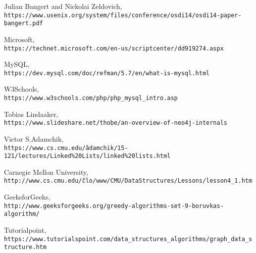 \documentclass[onecolumn, draftclsnofoot, 10pt, compsoc]{IEEEtran}
\begin{document}
\newpage
\begin{thebibliography}{9}

Julian Bangert and Nickolai Zeldovich, 
\\\texttt{https://www.usenix.org/system/files/conference/osdi14/osdi14-paper-bangert.pdf}


Microsoft,
\\\texttt{https://technet.microsoft.com/en-us/scriptcenter/dd919274.aspx}

MySQL,
\\\texttt{https://dev.mysql.com/doc/refman/5.7/en/what-is-mysql.html}

W3Schools,
\\\texttt{https://www.w3schools.com/php/php\_mysql\_intro.asp}

Tobias Lindaaker,
\\\texttt{https://www.slideshare.net/thobe/an-overview-of-neo4j-internals}

Victor S.Adamchik,
\\\texttt{https://www.cs.cmu.edu/\~adamchik/15-121/lectures/Linked\%20Lists/linked\%20lists.html}

Carnegie Mellon University,
\\\texttt{http://www.cs.cmu.edu/\~clo/www/CMU/DataStructures/Lessons/lesson4\_1.htm}

GeeksforGeeks,
\\\texttt{http://www.geeksforgeeks.org/greedy-algorithms-set-9-boruvkas-algorithm/}

Tutorialpoint,
\\\texttt{https://www.tutorialspoint.com/data\_structures\_algorithms/graph\_data\_structure.htm}

\end{thebibliography}
\end{document}
